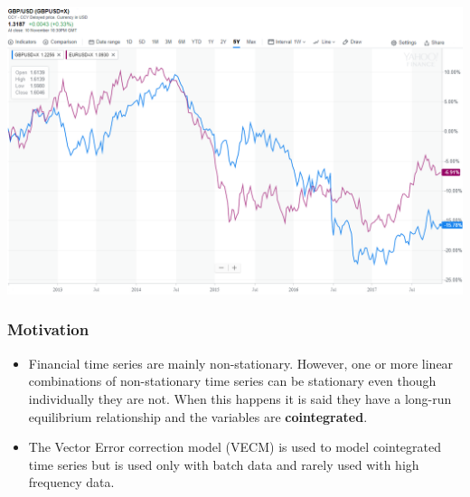 \documentclass{beamer}
\begin{document}
\begin{frame}
\hspace*{-4mm}
\includegraphics[width=0.9\paperwidth]{img/motivation.png}
\end{frame}

\begin{frame}
\frametitle{Motivation}
\begin{itemize}
\item Financial time series are mainly non-stationary.  However, one or more linear
combinations of non-stationary time series can be stationary even though
individually they are not. When this happens it is said they have a long-run
equilibrium relationship and the variables are \textbf{cointegrated}.
\item The Vector Error correction model (VECM) is used to model cointegrated time series but is used only with batch data and rarely used with high frequency data.
\end{itemize}
\end{frame}
\end{document}
